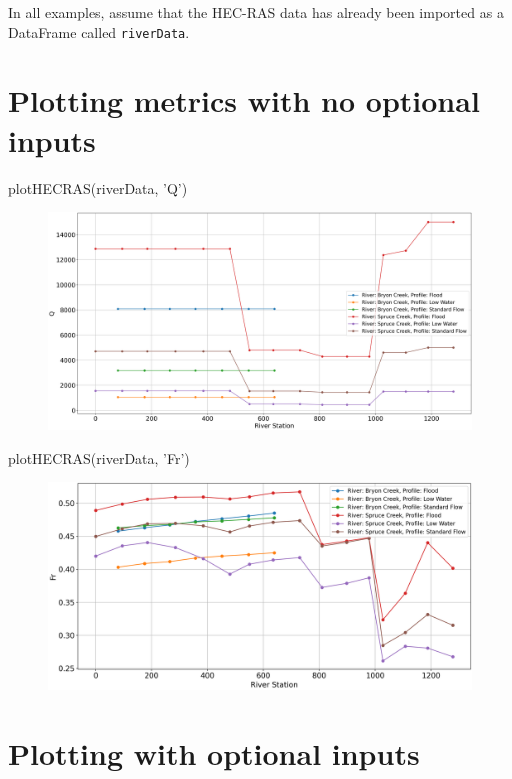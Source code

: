 \documentclass{article}
\begin{document}
\noindent In all examples, assume that the HEC-RAS data has already been imported as a DataFrame called \texttt{riverData}.

\section*{Plotting metrics with no optional inputs}

\begin{python}
plotHECRAS(riverData, 'Q')
\end{python}

\begin{figure}[h]
    \centering
    \includegraphics[width=\textwidth]{defaultCase.png}
\end{figure}

\begin{python}
plotHECRAS(riverData, 'Fr')
\end{python}

\begin{figure}[h]
    \centering
    \includegraphics[width=\textwidth]{Fr_allRivers.png}
\end{figure}

\newpage

\section*{Plotting with optional inputs}
\end{document}
